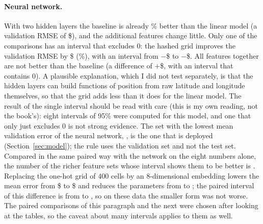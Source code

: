 \paragraph{Neural network.} With two hidden layers the baseline is already \% better than the linear model (a validation RMSE of \$), and the additional features change little. Only one of the  comparisons has an interval that excludes 0: the hashed grid improves the validation RMSE by \$ (\%), with an interval from $-$\$ to $-$\$. All features together are not better than the baseline (a difference of $+$\$, with an interval that contains 0). A plausible explanation, which I did not test separately, is that the hidden layers can build functions of position from raw latitude and longitude themselves, so that the grid adds less than it does for the linear model. The result of the single interval should be read with care (this is my own reading, not the book's): eight intervals of 95\% were computed for this model, and one that only just excludes 0 is not strong evidence. The set with the lowest mean validation error of the neural network, \texttt{}, is the one that is deployed (Section~\ref{sec:model}); the rule uses the validation set and not the test set. Compared in the same paired way with the network on the eight numbers alone, the number of the  richer feature sets whose interval shows them to be better is . Replacing the one-hot grid of 400 cells by an 8-dimensional embedding lowers the mean error from \$ to \$ and reduces the parameters from  to ; the paired interval of this difference is from  to , so on these data the smaller form was not worse. The paired comparisons of this paragraph and the next were chosen after looking at the tables, so the caveat about many intervals applies to them as well.

